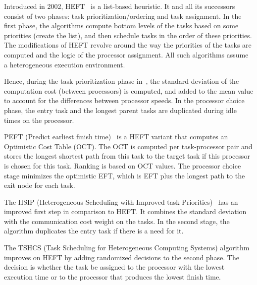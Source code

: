 \documentclass[conference]{IEEEtran}
\newcommand{\hmey}[1]{{\color{red}[HM: #1]}}
\begin{document}
    Introduced in 2002, HEFT~\cite{topcuoglu2002performance} is a list-based heuristic.
    It and all its successors consist of two phases: task prioritization/ordering and task assignment.
    In the first phase, the algorithms compute bottom levels of the tasks based on some priorities (create the list),
    and then schedule tasks in the order of these priorities.
    The modifications of HEFT revolve around the way the priorities of the tasks are computed and the logic of the processor assignment.
    All such algorithms assume a heterogeneous execution environment.

    Hence, during the task prioritization phase in~\cite{sulaiman2021hybrid},  the standard deviation of the computation cost
    (between processors) is computed, and added to the mean value to account for the differences between processor speeds.
    In the processor choice phase, the entry task and the longest parent tasks are duplicated 
    during idle times on the processor.


    PEFT (Predict earliest finish time)~\cite{arabnejad2014list} is a HEFT variant that computes an Optimistic
    Cost Table (OCT).
    The OCT is computed per task-processor pair and stores the longest shortest path from this task to the target task if this
    processor is chosen for this task.
    Ranking is based on OCT values.
    The processor choice stage minimizes the optimistic EFT, which is EFT plus the longest path to the exit node for each task.

    The HSIP (Heterogeneous Scheduling with Improved task Priorities)~\cite{wang2016hsip} has an improved first step in
    comparison to HEFT.
    It combines the standard deviation with the communication cost weight on the tasks.
    In the second stage, the algorithm duplicates the entry task if there is a need for it.

    The TSHCS (Task Scheduling for Heterogeneous Computing Systems) algorithm~\cite{alebrahim2017task} improves on HEFT
    by adding randomized decisions to the second phase.
    The decision is whether the task be assigned to the processor with the lowest execution time or to the processor that
    produces the lowest finish time.
\end{document}
